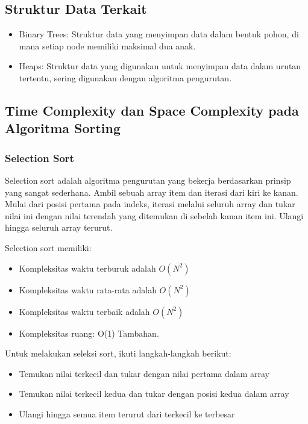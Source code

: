 \documentclass{article}
\begin{document}
\subsection{Struktur Data Terkait}
\begin{itemize}
    \item Binary Trees: Struktur data yang menyimpan data dalam bentuk pohon, di mana setiap node memiliki maksimal dua anak.
    \item Heaps: Struktur data yang digunakan untuk menyimpan data dalam urutan tertentu, sering digunakan dengan algoritma pengurutan.
\end{itemize}

\subsection{Time Complexity dan Space Complexity pada Algoritma Sorting}
\subsubsection{Selection Sort}
Selection sort adalah algoritma pengurutan yang bekerja berdasarkan prinsip yang sangat sederhana. Ambil sebuah array item dan iterasi dari kiri ke kanan. Mulai dari posisi pertama pada indeks, iterasi melalui seluruh array dan tukar nilai ini dengan nilai terendah yang ditemukan di sebelah kanan item ini. Ulangi hingga seluruh array terurut.

Selection sort memiliki:
\begin{itemize}
    \item Kompleksitas waktu terburuk adalah \(O(N^2)\)
    \item Kompleksitas waktu rata-rata adalah \(O(N^2)\)
    \item Kompleksitas waktu terbaik adalah \(O(N^2)\)
    \item Kompleksitas ruang: O(1) Tambahan.
\end{itemize}

Untuk melakukan seleksi sort, ikuti langkah-langkah berikut:
\begin{itemize}
    \item Temukan nilai terkecil dan tukar dengan nilai pertama dalam array
    \item Temukan nilai terkecil kedua dan tukar dengan posisi kedua dalam array
    \item Ulangi hingga semua item terurut dari terkecil ke terbesar
\end{itemize}
\end{document}
